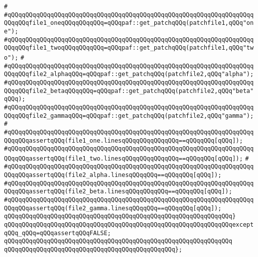\verb|#|\newline
\verb|#qQQqqQQqqQQqqQQqqQQqqQQqqQQqqQQqqQQqqQQqqQQqqQQqqQQqqQQqqQQqqQQqqQQqqQQqqQQqfile1_oneqQQqqQQqqQQq=qQQqpaf::get_patchqQQq(patchfile1,qQQq"one");|\newline
\verb|#qQQqqQQqqQQqqQQqqQQqqQQqqQQqqQQqqQQqqQQqqQQqqQQqqQQqqQQqqQQqqQQqqQQqqQQqqQQqfile1_twoqQQqqQQqqQQq=qQQqpaf::get_patchqQQq(patchfile1,qQQq"two");|\newline
\verb|#|\newline
\verb|#qQQqqQQqqQQqqQQqqQQqqQQqqQQqqQQqqQQqqQQqqQQqqQQqqQQqqQQqqQQqqQQqqQQqqQQqqQQqfile2_alphaqQQq=qQQqpaf::get_patchqQQq(patchfile2,qQQq"alpha");|\newline
\verb|#qQQqqQQqqQQqqQQqqQQqqQQqqQQqqQQqqQQqqQQqqQQqqQQqqQQqqQQqqQQqqQQqqQQqqQQqqQQqfile2_betaqQQqqQQq=qQQqpaf::get_patchqQQq(patchfile2,qQQq"beta"qQQq);|\newline
\verb|#qQQqqQQqqQQqqQQqqQQqqQQqqQQqqQQqqQQqqQQqqQQqqQQqqQQqqQQqqQQqqQQqqQQqqQQqqQQqfile2_gammaqQQq=qQQqpaf::get_patchqQQq(patchfile2,qQQq"gamma");|\newline
\verb|#|\newline
\verb|#qQQqqQQqqQQqqQQqqQQqqQQqqQQqqQQqqQQqqQQqqQQqqQQqqQQqqQQqqQQqqQQqqQQqqQQqqQQqassertqQQq(file1_one.linesqQQqqQQqqQQqqQQq==qQQqqQQq[qQQq]);|\newline
\verb|#qQQqqQQqqQQqqQQqqQQqqQQqqQQqqQQqqQQqqQQqqQQqqQQqqQQqqQQqqQQqqQQqqQQqqQQqqQQqassertqQQq(file1_two.linesqQQqqQQqqQQqqQQq==qQQqqQQq[qQQq]);|\newline
\verb|#|\newline
\verb|#qQQqqQQqqQQqqQQqqQQqqQQqqQQqqQQqqQQqqQQqqQQqqQQqqQQqqQQqqQQqqQQqqQQqqQQqqQQqassertqQQq(file2_alpha.linesqQQqqQQq==qQQqqQQq[qQQq]);|\newline
\verb|#qQQqqQQqqQQqqQQqqQQqqQQqqQQqqQQqqQQqqQQqqQQqqQQqqQQqqQQqqQQqqQQqqQQqqQQqqQQqassertqQQq(file2_beta.linesqQQqqQQqqQQq==qQQqqQQq[qQQq]);|\newline
\verb|#qQQqqQQqqQQqqQQqqQQqqQQqqQQqqQQqqQQqqQQqqQQqqQQqqQQqqQQqqQQqqQQqqQQqqQQqqQQqassertqQQq(file2_gamma.linesqQQqqQQq==qQQqqQQq[qQQq]);|\newline
\verb|qQQqqQQqqQQqqQQqqQQqqQQqqQQqqQQqqQQqqQQqqQQqqQQqqQQqqQQqqQQqqQQq}|\newline
\verb|qQQqqQQqqQQqqQQqqQQqqQQqqQQqqQQqqQQqqQQqqQQqqQQqqQQqqQQqqQQqqQQqexceptqQQq_qQQq=qQQqassertqQQqFALSE;|\newline
\verb|qQQqqQQqqQQqqQQqqQQqqQQqqQQqqQQqqQQqqQQqqQQqqQQqqQQqqQQqqQQqqQQq|\newline
\verb|qQQqqQQqqQQqqQQqqQQqqQQqqQQqqQQqqQQqqQQqqQQqqQQq};|\newline
